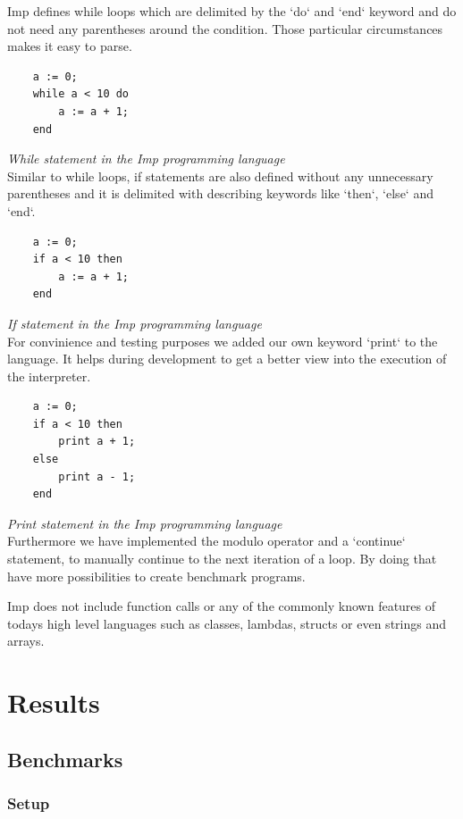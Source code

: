 \documentclass{article}
\begin{document}
Imp defines while loops which are delimited by the `do` and `end` keyword and
do not need any parentheses around the condition. Those particular circumstances
makes it easy to parse.

\begin{verbatim}
    a := 0;
    while a < 10 do
        a := a + 1;
    end
\end{verbatim}
\textit{While statement in the Imp programming language} \\

Similar to while loops, if statements are also defined without any unnecessary
parentheses and it is delimited with describing keywords like `then`, `else`
and `end`.

\begin{verbatim}
    a := 0;
    if a < 10 then
        a := a + 1;
    end
\end{verbatim}
\textit{If statement in the Imp programming language} \\

For convinience and testing purposes we added our own keyword `print` to the
language. It helps during development to get a better view into the execution
of the interpreter.

\begin{verbatim}
    a := 0;
    if a < 10 then
        print a + 1;
    else
        print a - 1;
    end
\end{verbatim}
\textit{Print statement in the Imp programming language} \\

Furthermore we have implemented the modulo operator and a `continue` statement,
to manually continue to the next iteration of a loop. By doing that have more
possibilities to create benchmark programs.

Imp does not include function calls or any of the commonly known features of
todays high level languages such as classes, lambdas, structs or even strings
and arrays.

\section{Results}

\subsection{Benchmarks}
\subsubsection{Setup}
\end{document}
